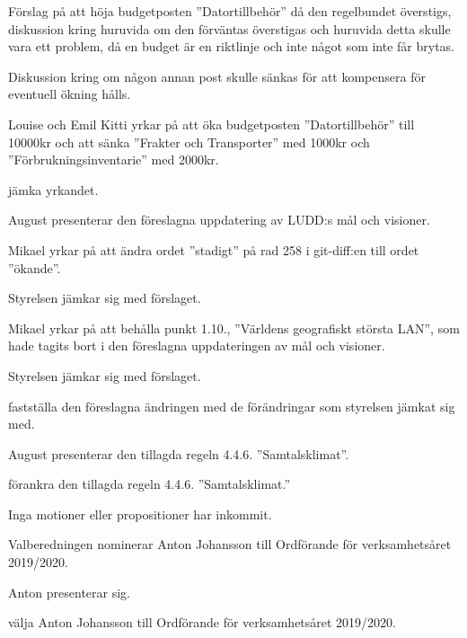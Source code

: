\documentclass{protokoll}
\begin{document}
Förslag på att höja budgetposten ''Datortillbehör'' då den regelbundet
överstigs, diskussion kring huruvida om den förväntas överstigas och huruvida
detta skulle vara ett problem, då en budget är en riktlinje och inte något som
inte får brytas.  

Diskussion kring om någon annan post skulle sänkas för att kompensera för
eventuell ökning hålls. 

Louise och Emil Kitti yrkar på att öka budgetposten ''Datortillbehör'' till 
10000kr och att sänka ''Frakter och Transporter'' med 1000kr och ''Förbrukningsinventarie'' med 2000kr. 
\begin{beslut}
  \att jämka yrkandet. 
\end{beslut}

August presenterar den föreslagna uppdatering av LUDD:s mål och visioner. 

Mikael yrkar på att ändra ordet ''stadigt'' på rad 258 i git-diff:en till ordet
''ökande''. 

Styrelsen jämkar sig med förslaget. 


Mikael yrkar på att behålla punkt 1.10., ''Världens geografiskt största LAN'',
som hade tagits bort i den föreslagna uppdateringen av mål och visioner. 

Styrelsen jämkar sig med förslaget. 

\begin{beslut}
  \att fastställa den föreslagna ändringen med de förändringar som styrelsen 
  jämkat sig med. 
\end{beslut}


August presenterar den tillagda regeln 4.4.6. ''Samtalsklimat''.

\begin{beslut}
  \att förankra den tillagda regeln 4.4.6. ''Samtalsklimat.''
\end{beslut}

Inga motioner eller propositioner har inkommit.

Valberedningen nominerar Anton Johansson till Ordförande för verksamhetsåret 2019/2020.

Anton presenterar sig.

\begin{beslut}
  \att välja Anton Johansson till Ordförande för verksamhetsåret 2019/2020.
\end{beslut}
\end{document}
